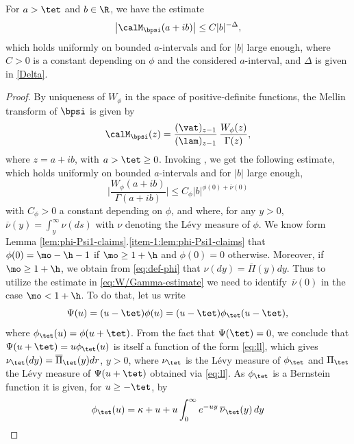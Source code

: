 \begin{lemma}
\label{lem:Mellin-bpsi}
For $a > \tet$ and $b \in \R$, we have the estimate
\begin{equation*}
\left| \calM_\bpsi(a+ib) \right| \leq C|b|^{-\Delta},
\end{equation*}
which holds uniformly on bounded $a$-intervals and for $|b|$ large enough,
where $C > 0$ is a constant depending on $\phi$ and the considered $a$-interval, and $\Delta$ is given in \eqref{Delta}.
\end{lemma}

\begin{proof}
By uniqueness of $W_\phi$ in the space of positive-definite functions, the Mellin transform of $\bpsi$ is given by
\begin{equation*}
\calM_\bpsi(z) = \frac{(\vat)_{z-1}}{(\lam)_{z-1}}\,\frac{W_\phi(z)}{\Gamma(z)},
\end{equation*}
where $z = a+ib$, with $a > \tet \geq 0$. Invoking \cite[Eq.\,(6.20)]{Patie-Savov-Bern}, we get the following estimate, which holds uniformly on bounded $a$-intervals and for $|b|$ large enough,
\begin{equation}
\label{eq:W/Gamma-estimate}
\biggl| \frac{W_\phi(a+ib)}{\Gamma(a+ib)}\biggr| \leq C_\phi |b|^{\phi(0)+\overline{\nu}(0)}
\end{equation}
with $C_\phi > 0$ a constant depending on $\phi$, and where, for any $y > 0$, $\overline{\nu}(y) = \int_y^\infty \nu(ds)$ with $\nu$ denoting the Lévy measure of $\phi$. We know form Lemma \ref{lem:phi-Psi1-claims}.\eqref{item-1:lem:phi-Psi1-claims}
that $\phi(0) = \mo-\h - 1$ if $\mo \ge 1+\h$ and $\phi(0) = 0$ otherwise.
Moreover, if $\mo \ge 1+\h$, we obtain from \eqref{eq:def-phi} that $\nu(dy) = \overline{\Pi}(y)dy$.
Thus to utilize the estimate in \eqref{eq:W/Gamma-estimate} we need to identify~$\overline{\nu}(0)$ in the case $\mo < 1+\h$. To do that, let us write
\[
\Psi(u) = (u-\tet)\phi(u) = (u-\tet)\phi_{\tet}(u-\tet),
\]
where $\phi_{\tet}(u) = \phi(u+\tet)$. From the fact that $\Psi(\tet)=0$, we conclude that $\Psi(u+\tet) = u\phi_{\tet}(u)$ is itself a function of the form \eqref{eq:ll}, which gives $\nu_{\tet}(dy) = \overline{\Pi}_{\tet}(y)dr$, $y>0$, where $\nu_{\tet}$ is the Lévy measure of $\phi_{\tet}$ and
$\Pi_{\tet}$ the Lévy measure of $\Psi(u+\tet)$ obtained via \eqref{eq:ll}. As $\phi_{\tet}$ is a Bernstein function it is given, for $u \geq -\tet$, by
\begin{equation*}
\phi_{\tet}(u) = \kappa+u+u\int_0^\infty e^{-uy}\, \overline{\nu}_{\tet}(y)\,dy

\end{equation*}
\end{proof}
